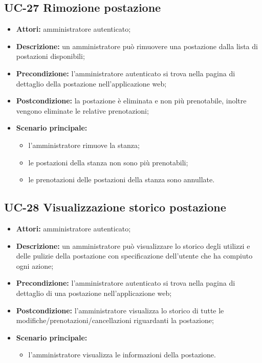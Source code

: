 \subsection{UC-27 Rimozione postazione}
\begin{itemize}
    \item \textbf{Attori:} amministratore autenticato;
    \item \textbf{Descrizione:} un amministratore pu\`{o} rimuovere una postazione dalla lista di postazioni disponibili;
    \item \textbf{Precondizione:} l'amministratore autenticato si trova nella pagina di dettaglio della postazione nell'applicazione web;
    \item \textbf{Postcondizione:} la postazione \`{e} eliminata e non più prenotabile, inoltre vengono eliminate le relative prenotazioni;
    \item \textbf{Scenario principale:}
    \begin{itemize}
        \item l'amministratore rimuove la stanza;
        \item le postazioni della stanza non sono pi\`{u} prenotabili;
        \item le prenotazioni delle postazioni della stanza sono annullate.
    \end{itemize}
\end{itemize}


\subsection{UC-28 Visualizzazione storico postazione}
\begin{itemize}
    \item \textbf{Attori:} amministratore autenticato;
    \item \textbf{Descrizione:} un amministratore pu\`{o} visualizzare lo storico degli utilizzi e delle pulizie della postazione con specificazione dell'utente che ha compiuto ogni azione;
    \item \textbf{Precondizione:} l'amministratore autenticato si trova nella pagina di dettaglio di una postazione nell'applicazione web;
    \item \textbf{Postcondizione:} l'amministratore visualizza lo storico di tutte le modifiche/prenotazioni/cancellazioni riguardanti la postazione;
    \item \textbf{Scenario principale:}
    \begin{itemize}
        \item l'amministratore visualizza le informazioni della postazione.
    \end{itemize}
\end{itemize}



